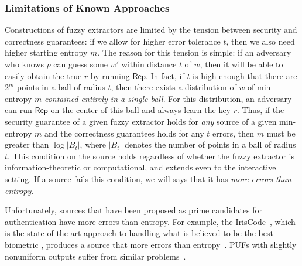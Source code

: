 \documentclass[11pt]{article}
\renewcommand{\paragraph}[1]{\subsubsection{#1}}
\newcommand{\class}[1]{{\ensuremath{\mathsf{#1}}}}
\newcommand{\rep}{\ensuremath{\class{Rep}}\xspace}
\newcommand{\Huse}{\mathrm{H}_{\mathtt{usable}}}
\begin{document}
\paragraph{Limitations of Known Approaches}

Constructions of fuzzy extractors are limited by the tension between security and correctness guarantees: if we allow for higher error tolerance $t$, then we also need higher starting entropy $m$. The reason for this tension is simple: if an adversary who knows $p$ can guess some $w'$ within distance $t$ of $w$, then it will be able to easily obtain the true $r$ by running $\rep$.
In fact, if $t$ is high enough that there are $2^m$ points in a ball of radius $t$, then there exists a distribution of $w$ of min-entropy $m$  \emph{contained entirely in a single ball}.  For this distribution, an adversary can run $\rep$ on the center of this ball and always learn the key $r$.
Thus, if the security guarantee of a given fuzzy extractor holds for \emph{any} source of a given min-entropy $m$ and the correctness guarantees holds for any $t$ errors, then $m$ must   be greater than $\log |B_t|$, where $|B_t|$ denotes the number of points in a ball of radius $t$.  This condition on the source holds regardless of whether the fuzzy extractor is information-theoretic or computational, and extends even to the interactive setting.
If a source fails this condition, we will says that it has \emph{more errors than entropy}.




Unfortunately, sources that have been proposed as prime candidates for authentication have more errors than entropy.
For example, the IrisCode~\cite{daugman2004}, which is the state of the art approach to handling what is believed to be the best biometric \cite{prabhakar2003biometric}, produces a source that more errors than entropy~\cite[Section 5]{blanton2009biometric}. PUFs with slightly nonuniform outputs suffer from similar problems~\cite{koeberl2014entropy}.
\end{document}

